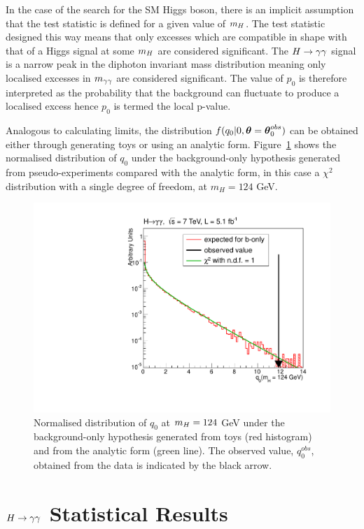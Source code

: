 In the case of the search for the SM Higgs boson, there is an implicit assumption that
the test statistic is defined for a given value of $m_{H}$. The test statistic designed this way
means that only excesses which are compatible in shape with that of a Higgs signal at some $m_{H}$
are considered significant. The $H\rightarrow\gamma\gamma$ signal is a narrow peak in the diphoton invariant mass distribution
meaning only localised excesses in $m_{\gamma\gamma}$ are considered significant.
The value of $p_{0}$ is therefore interpreted as the probability that the background can 
fluctuate to produce a localised excess hence $p_{0}$ is termed the local p-value.

Analogous to calculating limits, the distribution $f(q_{0} |0,{\boldsymbol{\theta}}={\boldsymbol{\theta}}_{0}^{obs})$ can be obtained either
through generating toys or using an analytic form. Figure~\ref{fig:q0dist} shows the normalised distribution
of $q_{0}$ under the background-only hypothesis generated from pseudo-experiments compared with the 
analytic form, in this case a $\chi^{2}$ distribution with a single degree of freedom, at $m_{H}=124$ GeV.

\begin{figure}
\begin{center}
  \includegraphics[width=.8\textwidth]{hgg7TeV/statsPlots/q0_example_125_chi2_sqr.pdf}
\end{center}
 \caption{Normalised distribution of $q_{0}$ at $m_{H}=124$ GeV under the background-only 
 hypothesis generated  from toys (red histogram) and from the analytic form (green line). 
 The observed value, $q_{0}^{obs}$, obtained from the data is indicated by the black arrow.}
 \label{fig:q0dist}
\end{figure}
 


\section{$H\rightarrow\gamma\gamma$ Statistical Results}
\label{sec:hggresults2011}

